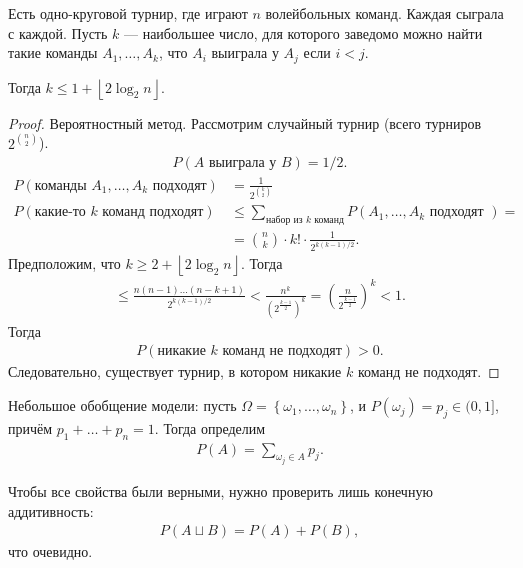 \begin{thm}
 Есть одно-круговой турнир, где играют $n$ волейбольных команд. Каждая сыграла с каждой. Пусть $k$ --- наибольшее число, для которого заведомо можно найти такие команды  $A_1, \ldots, A_k$, что $A_i$ выиграла у $A_j$ если $i < j$.

 Тогда $k \leqslant 1 + \left\lfloor 2 \log_2 n  \right\rfloor$.
\end{thm}
\begin{proof}
 Вероятностный метод. Рассмотрим случайный турнир (всего турниров $2^{\binom n 2}$).
 \begin{align*}
  P(A \text{ выиграла у } B) = 1 / 2
 .\end{align*} 
 \begin{align*}
  P(\text{команды } A_1, \ldots, A_k \text{ подходят}) &= \frac{1}{2^{\binom k 2}} \\
  P(\text{какие-то $k$ команд подходят}) &\leqslant \sum_{\text{набор из $k$ команд}} P(A_1, \ldots, A_k \text{ подходят }) = \\
  &= \binom n k \cdot k!  \cdot \frac{1}{2^{k(k-1) / 2}}
 .\end{align*} Предположим, что $k \geqslant 2 + \left\lfloor 2 \log_2 n \right\rfloor $. Тогда
 \begin{align*}
  \leqslant \frac{n (n-1) \ldots (n-k+1)}{2^{k(k-1) / 2}} < \frac{n^{k}}{\left(2^{\frac{k-1}{2}}\right)^{k}} = (\frac{n}{2^{\frac{k-1}{2}}})^{k} < 1
 .\end{align*} Тогда
 \begin{align*}
  P(\text{никакие $k$ команд не подходят}) > 0
 .\end{align*} Следовательно, существует турнир, в котором никакие $k$ команд не подходят.
\end{proof}

\begin{df*}
 
Небольшое обобщение модели: пусть $\Omega = \left\{ \omega_1, \ldots, \omega_n \right\}$, и $P(\omega_j) = p_j \in (0,1]$, причём $p_1 + \ldots + p_n = 1$. Тогда определим
\begin{align*}
 P(A) = \sum_{\omega_j \in A} p_j
.\end{align*}
\end{df*}

Чтобы все свойства были верными, нужно проверить лишь конечную аддитивность:
\begin{align*}
 P(A \sqcup B) = P(A) + P(B)
,\end{align*} что очевидно.
